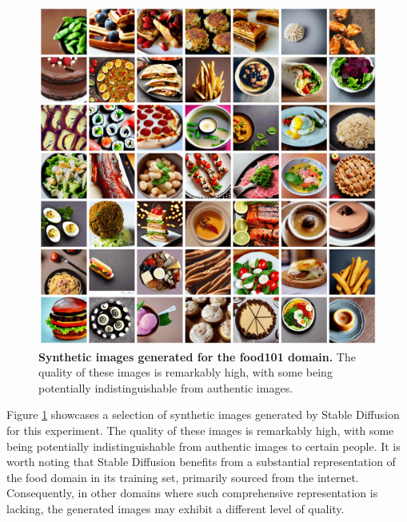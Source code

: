 \begin{figure}
    \centering
    \includegraphics[width=1\textwidth]{Pictures/synthetic-food101.png} 
    \caption{\textbf{Synthetic images generated for the food101 domain.} The quality of these images is remarkably high, with some being potentially indistinguishable from authentic images.}
    \label{fig:exp9-images}
\end{figure}

Figure \ref{fig:exp9-images} showcases a selection of synthetic images generated by Stable Diffusion for this experiment. The quality of these images is remarkably high, with some being potentially indistinguishable from authentic images to certain people. It is worth noting that Stable Diffusion benefits from a substantial representation of the food domain in its training set, primarily sourced from the internet. Consequently, in other domains where such comprehensive representation is lacking, the generated images may exhibit a different level of quality.